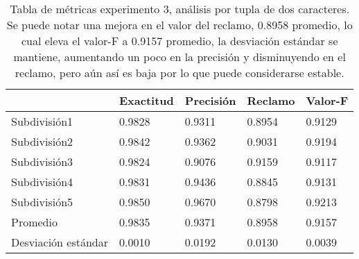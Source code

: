 \begin{table}[h]
    \centering
    \caption{Tabla de métricas experimento 3, análisis por tupla de dos caracteres. Se puede notar una mejora en el valor del reclamo, 0.8958 promedio, lo cual eleva el valor-F a 0.9157 promedio, la desviación estándar se mantiene, aumentando un poco en la precisión y disminuyendo en el reclamo, pero aún así es baja por lo que puede considerarse estable. }
\begin{tabular}{|l|llll|}
\hline
& Exactitud &     Precisión &     Reclamo  &   Valor-F \\ \hline
              
Subdivisión1            &       0.9828  &       0.9311  &       0.8954  &       0.9129  \\ 
Subdivisión2            &       0.9842  &       0.9362  &       0.9031  &       0.9194  \\ 
Subdivisión3            &       0.9824  &       0.9076  &       0.9159  &       0.9117  \\ 
Subdivisión4            &       0.9831  &       0.9436  &       0.8845  &       0.9131  \\ 
Subdivisión5            &       0.9850  &       0.9670  &       0.8798  &       0.9213  \\ \hline
Promedio                &       0.9835  &       0.9371  &       0.8958  &       0.9157  \\ \hline
Desviación estándar     &       0.0010  &       0.0192  &       0.0130  &       0.0039  \\ \hline

\end{tabular}
		     \label{tab:exp3}
\end{table}